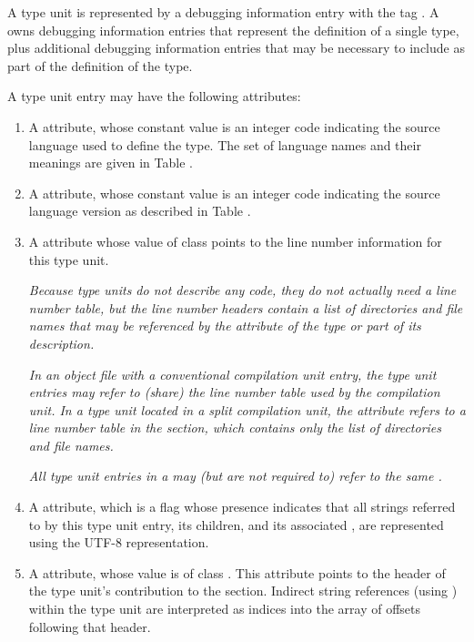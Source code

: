 A type unit is represented by a debugging information entry
with the tag \DWTAGtypeunitTARG. 
A  owns debugging
information entries that represent the definition of a single
type, plus additional debugging information entries that may
be necessary to include as part of the definition of the type.

A type unit entry may have the following attributes:
\begin{enumerate}[1. ]

\item A
\bb
\DWATlanguagename{} attribute, 
whose
\eb
{}
constant value is an integer code indicating the source
language used to define the type. The set of language names
and their meanings are given in Table .

\bb
\item A \DWATlanguageversion{} attribute, whose constant value is an 
integer code indicating the source language version as described in
Table .
\eb

\item A \DWATstmtlist{} attribute
whose value of class \CLASSlineptr{} points to the line number 
information for this type unit.

\textit{Because type units do not describe any code, they
do not actually need a line number table, but the line number
headers contain a list of directories and file names that
may be referenced by the \DWATdeclfile{} attribute of the
type or part of its description.} 

\textit{In an object file with a conventional compilation 
unit entry, the type unit entries may refer to (share) the 
line number table used by the compilation unit. In a type 
unit located in a split compilation unit, the 
\DWATstmtlistNAME{} attribute refers to a 
line number table in the \dotdebuglinedwo{} section, which
contains only the list of directories and file names.}

\textit{All type unit entries in a \splitDWARFobjectfile{} may 
(but are not required to) refer to the same 
.}

\item A \DWATuseUTFeight{} attribute, which is a flag
whose presence indicates that all strings referred to by this type
unit entry, its children, and its associated 
, 
are represented using the UTF-8 representation.

\item A 
\bb
\DWATstroffsets{}
\eb
attribute, whose value is of class \CLASSstroffsetsptr. 
This attribute points to the 
\bb
header
\eb 
of the type unit's contribution to
the \dotdebugstroffsets{} section. Indirect string references
(using \DWFORMstrxXNor) within the type unit are interpreted
as indices 
\bb
into the array of offsets following that header.
\eb

\end{enumerate}

